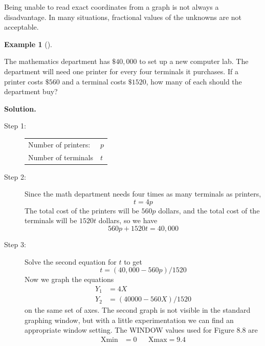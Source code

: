 \documentclass[10pt,]{book}
\theoremstyle{plain}
\theoremstyle{definition}
\theoremstyle{definition}
\newtheorem{example}[theorem]{Example}
\theoremstyle{definition}
\theoremstyle{definition}
\numberwithin{equation}{section}
\newcommand{\amp}{ & }
\begin{document}
	Being unable to read exact coordinates from a graph is not always a disadvantage. In many situations, fractional values of the unknowns are not acceptable.
%
\begin{example}[]\label{example-8}

		The mathematics department has \(\$40,000\) to set up a new computer lab. The department will need one printer for every four terminals it purchases. If a printer costs \(\$560\) and a terminal costs \(\$1520\), how many of each should the department buy?
\par\medskip\noindent%
\textbf{Solution.}\quad 
		\leavevmode%
\begin{description}
\item[Step 1:]{}
				\begin{tabular}{ll}
Number of printers:%
&\(p\)\tabularnewline[0pt]
Number of terminals%
&\(t\)
\end{tabular}

\item[Step 2:]{}
				Since the math department needs four times as many terminals as printers,
				\begin{equation*}t=4p\end{equation*}
				The total cost of the printers will be \(560p\) dollars, and the total cost of the terminals will be \(1520t\) dollars, so we have
				\begin{equation*}560p + 1520t = 40,000\end{equation*}
\item[Step 3:]{}
				Solve the second equation for \(t\) to get
				\begin{equation*}t=(40,000 - 560p)/1520\end{equation*}
				Now we graph the equations
				\begin{align*}

						Y_1 \amp =4X
					\\

						Y_2 \amp =(40000 − 560X)/1520
					
\end{align*}
				on the same set of axes. The second graph is not visible in the standard graphing window, but with a little experimentation we can find an appropriate window setting. The WINDOW values used for Figure 8.8 are
				\begin{align*}

						\text{Xmin} \amp = 0 \amp\amp \text{Xmax} = 9.4
					\\


\end{align*}
\end{description}
\end{example}
\end{document}
